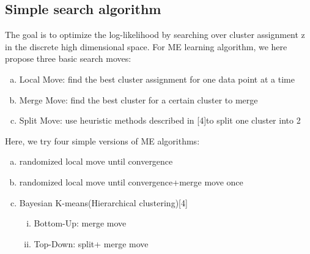\documentclass{article}
\begin{document}
\subsection{Simple search algorithm}
The goal is to optimize the log-likelihood by searching over cluster assignment z in the discrete high dimensional space.
For ME learning algorithm, we here propose three basic search moves:
\begin{enumerate}[(a)]
\item Local Move: find the best cluster assignment for one data point at a time
\item Merge Move: find the best cluster for a certain cluster to merge
\item Split Move: use heuristic methods described in [4]to split one cluster into 2
\end{enumerate}
Here, we try four simple versions of ME algorithms:
\begin{enumerate}[(a)]
\item randomized local move until convergence
\item randomized local move until convergence+merge move once
\item Bayesian K-means(Hierarchical clustering)[4]
\begin{enumerate}[(i)]
 \item Bottom-Up: merge move
 \item Top-Down: split+ merge move
\end{enumerate}
\end{enumerate}
\end{document}
